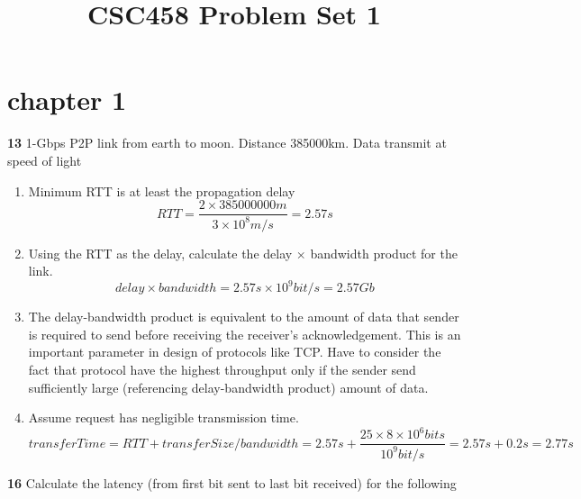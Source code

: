 \documentclass[11pt]{article}
\title{CSC458 Problem Set 1}
\begin{document}
\maketitle

\section*{chapter 1}

\textbf{13} 1-Gbps P2P link from earth to moon. Distance 385000km. Data transmit at speed of light 

\begin{enumerate}
    \item Minimum RTT is at least the propagation delay
    \[
        RTT = \frac{2\times 385000000 m}{3\times 10^8 m/s} = 2.57s
    \]
    \item Using the RTT as the delay, calculate the delay $\times$ bandwidth product for the link.
    \[
        delay \times bandwidth = 2.57s \times 10^9 bit/s = 2.57 Gb
    \]
    \item The delay-bandwidth product is equivalent to the amount of data that sender is required to send before receiving the receiver's acknowledgement. This is an important parameter in design of protocols like TCP. Have to consider the fact that protocol have the highest throughput only if the sender send sufficiently large (referencing delay-bandwidth product) amount of data. 
    \item Assume request has negligible transmission time. 
    \[
        transferTime = RTT + transferSize/bandwidth = 2.57s + 
        \frac{25\times 8 \times 10^6 bits}{10^9 bit/s} = 2.57s + 0.2s = 2.77s 
    \]
\end{enumerate}
\textbf{16} Calculate the latency (from first bit sent to last bit received) for the following
\end{document}
